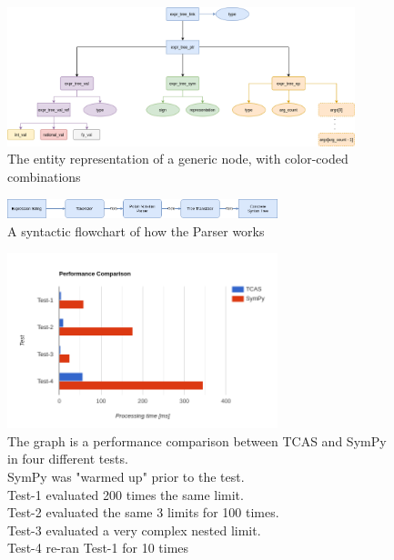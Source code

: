 \documentclass{article}
\theoremstyle{plain}
\theoremstyle{definition}
\begin{document}
	\begin{figure}
		\centering
		\includegraphics[width=0.9\textwidth]{chart/expr_structs.PNG}
		\caption{The entity representation of a generic node, with color-coded combinations} \label{fig:expr_structs}
	\end{figure}

	\begin{figure}
		\centering
		\includegraphics[width=0.7\textwidth]{chart/parser.PNG}
		\caption{A syntactic flowchart of how the Parser works} \label{fig:parser}
	\end{figure}

    \begin{figure}
		\centering
		\includegraphics[width=0.7\textwidth]{img/performance_graph.PNG}
		\caption{The graph is a performance comparison between TCAS and SymPy in four different tests.\\SymPy was "warmed up" prior to the test.\\Test-1 evaluated 200 times the same limit.\\Test-2 evaluated the same 3 limits for 100 times.\\Test-3 evaluated a very complex nested limit.\\Test-4 re-ran Test-1 for 10 times} \label{fig:performance_graph}  
	\end{figure}

	
	
\end{document}

